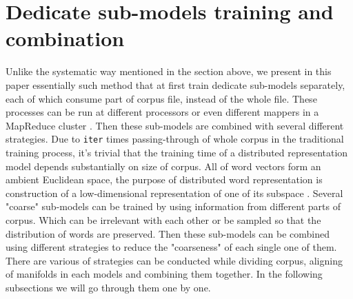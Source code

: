 \section{Dedicate sub-models training and combination}
Unlike the systematic way mentioned in the section above, we present in this paper essentially such method that at first train dedicate sub-models separately, each of which consume part of corpus file, instead of the whole file. These processes can be run at different processors or even different mappers in a MapReduce cluster \cite{dean2008mapreduce}. Then these sub-models are combined with several different strategies. Due to \verb|iter| times passing-through of whole corpus in the traditional training process, it's trivial that the training time of a distributed representation model depends substantially on size of corpus. All of word vectors form an ambient Euclidean space, the purpose of distributed word representation is construction of a low-dimensional representation of one of its subspace \cite{Mahadevan2015reasoning}. Several "coarse" sub-models can be trained by using information from different parts of corpus. Which can be irrelevant with each other or be sampled so that the distribution of words are preserved. Then these sub-models can be combined using different strategies to reduce the "coarseness" of each single one of them. There are various of strategies can be conducted while dividing corpus, aligning of manifolds in each models and combining them together. In the following subsections we will go through them one by one.







